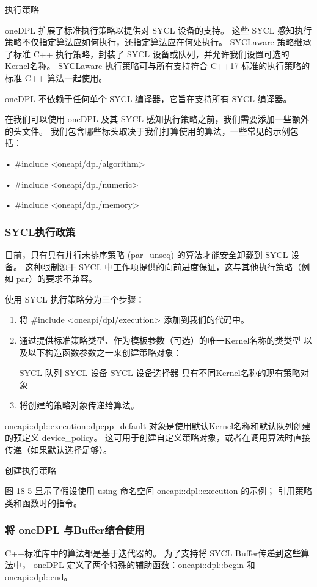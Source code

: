 {\color{red} 执行策略}

oneDPL 扩展了标准执行策略以提供对 SYCL 设备的支持。 
这些 SYCL 感知执行策略不仅指定算法应如何执行，还指定算法应在何处执行。 
SYCLaware 策略继承了标准 C++ 执行策略，封装了 SYCL 设备或队列，并允许我们设置可选的Kernel名称。 
SYCLaware 执行策略可与所有支持符合 C++17 标准的执行策略的标准 C++ 算法一起使用。

oneDPL 不依赖于任何单个 SYCL 编译器，它旨在支持所有 SYCL 编译器。

在我们可以使用 oneDPL 及其 SYCL 感知执行策略之前，我们需要添加一些额外的头文件。 
我们包含哪些标头取决于我们打算使用的算法，一些常见的示例包括：

• \#include <oneapi/dpl/algorithm>

• \#include <oneapi/dpl/numeric>

• \#include <oneapi/dpl/memory>

\subsubsection{SYCL执行政策}
目前，只有具有并行未排序策略 (par\_unseq) 的算法才能安全卸载到 SYCL 设备。 
这种限制源于 SYCL 中工作项提供的向前进度保证，这与其他执行策略（例如 par）的要求不兼容。

使用 SYCL 执行策略分为三个步骤：

\begin{enumerate}
	\item 将 \#include <oneapi/dpl/execution> 添加到我们的代码中。

	\item 通过提供标准策略类型、作为模板参数（可选）的唯一Kernel名称的类类型
	以及以下构造函数参数之一来创建策略对象：

		SYCL 队列 SYCL 设备 SYCL 设备选择器 具有不同Kernel名称的现有策略对象

	\item 将创建的策略对象传递给算法。
\end{enumerate}

oneapi::dpl::execution::dpcpp\_default 对象是使用默认Kernel名称和默认队列创建的预定义 device\_policy。 
这可用于创建自定义策略对象，或者在调用算法时直接传递（如果默认选择足够）。

{\color{red} 创建执行策略}

图 18-5 显示了假设使用 using 命名空间 oneapi::dpl::execution 的示例； 引用策略类和函数时的指令。

\subsubsection{将 oneDPL 与Buffer结合使用}
C++标准库中的算法都是基于迭代器的。 为了支持将 SYCL Buffer传递到这些算法中，
oneDPL 定义了两个特殊的辅助函数：oneapi::dpl::begin 和 oneapi::dpl::end。

